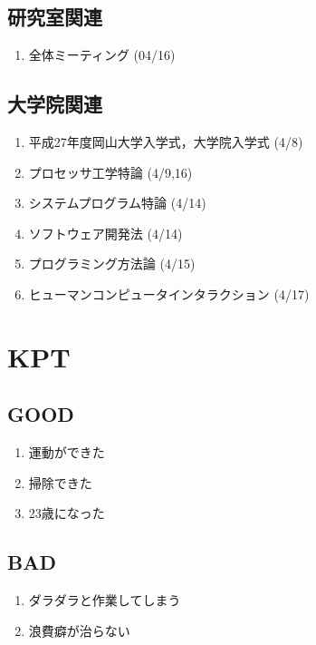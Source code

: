 \documentclass[fleqn, 12pt]{extarticlej}
\begin{document}
  \subsection{研究室関連}
  \begin{enumerate}
   \item 全体ミーティング
         \hfill
         (04/16)
  \end{enumerate}

  \subsection{大学院関連}
  \begin{enumerate}
    \item 平成27年度岡山大学入学式，大学院入学式
    \hfill
    \label{enum-univ2}
    (4/8)

    \item プロセッサ工学特論
    \hfill
    \label{enum-univ2}
    (4/9,16)
    \item システムプログラム特論
    \hfill
    \label{enum-univ2}
    (4/14)
    \item ソフトウェア開発法
    \hfill
    \label{enum-univ2}
    (4/14)
    \item プログラミング方法論
    \hfill
    \label{enum-univ2}
    (4/15)
    \item ヒューマンコンピュータインタラクション
    \hfill
    \label{enum-univ2}
    (4/17)


  \end{enumerate}

\section{KPT}
  \subsection{GOOD}
  \begin{enumerate}
   \item 運動ができた
   \item 掃除できた
   \item 23歳になった
  \end{enumerate}

  \subsection{BAD}
  \begin{enumerate}
   \item ダラダラと作業してしまう
   \item 浪費癖が治らない
  \end{enumerate}
\end{document}
